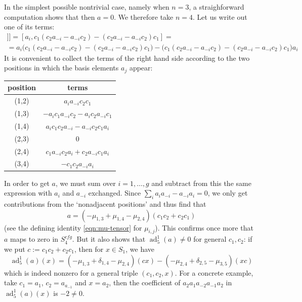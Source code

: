 \documentclass[12pt,letterpaper]{amsart}
\numberwithin{equation}{section}
\newcommand\ad{\operatorname{ad}}
\newcommand\cfg{\mathit{cfg}}
\theoremstyle{remark}
\begin{document}
In the simplest possible nontrivial case, 
namely when $n=3$, a straighforward computation shows that then $a=0$. We therefore take $n=4$. Let us write out one of its terms:
\begin{multline*}
[a_i[c_1,[c_2,a_{-i}]]]=[a_i, c_1(c_2a_{-i}-a_{-i}c_2)-(c_2a_{-i}-a_{-i}c_2)c_1]=\\
=a_i\big(c_1(c_2a_{-i}-a_{-i}c_2)-(c_2a_{-i}-a_{-i}c_2)c_1\big)-\big(c_1(c_2a_{-i}-a_{-i}c_2)-(c_2a_{-i}-a_{-i}c_2)c_1\big)a_i
\end{multline*}
It is convenient to collect the terms of the right hand side according to the two positions in which the basis elements  $a_j$ appear:
\begin{small}
\begin{center}
\begin{tabular}{|c|c|}
\hline 
position & terms \\
\hline 
(1,2) & $a_ia_{-i}c_2c_1$\\
(1,3) &  $-a_ic_1a_{-i}c_2-a_ic_2a_{-i}c_1$\\
(1,4) &  $a_ic_1c_2a_{-i}-a_{-i}c_2c_1a_i$\\
(2,3) & 0 \\
(2,4) & $c_1a_{-i}c_2a_i+c_2a_{-i}c_1a_i$\\
(3,4) & $-c_1c_2 a_{-i}a_i$\\
\hline
\end{tabular}
\end{center}
\end{small}
In order to get $a$, we must  sum over $i=1, \dots , g$ and subtract from this the same expression with 
$a_i$ and $a_{-i}$ exchanged.  Since $\sum_i a_ia_{-i}-a_{-i}a_{i}=0$,  we only get contributions from
the `nonadjacent positions' and  thus find that 
\[
a= (-\mu_{1,3}+\mu_{1,4}-\mu_{2,4})(c_1c_2+c_2c_1)
\]
(see the defining identity \eqref{eqn:mu-tensor} for $\mu_{i,j}$). This confirms once more that $a$ maps to zero in $S^\cfg_4$. But it also shows that $\ad^1_5(a)\not=0$ for general $c_1, c_2$: if we put 
$c:=c_1c_2+c_2c_1$, then for $x\in S_1$, we have 
\[
\ad^1_5(a)(x)= (-\mu_{1,3}+\delta_{1,4}-\mu_{2,4})(cx)-(-\mu_{2,4}+\delta_{2,5}-\mu_{3,5})(xc)
\]
which is indeed  nonzero for a general triple $(c_1, c_2,x)$.
For a concrete example, take $c_1=a_1$, $c_2=a_{a_{-1}}$ and $x=a_{2}$, then the coefficient of $a_2a_1a_{-2}a_{-1}a_2$ in $\ad^1_5(a)(x)$ is $-2\neq 0$.
\end{document}
